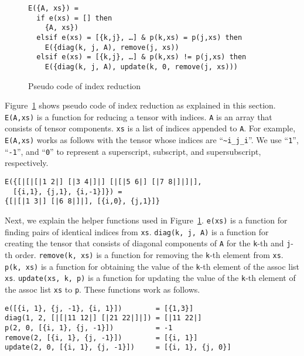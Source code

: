 \documentclass[acmlarge]{acmart}
\begin{document}
\begin{figure}
  \begin{center}
{\footnotesize
\begin{verbatim}
E({A, xs}) =
  if e(xs) = [] then
    {A, xs})
  elsif e(xs) = [{k,j}, …] & p(k,xs) = p(j,xs) then
    E({diag(k, j, A), remove(j, xs))
  elsif e(xs) = [{k,j}, …] & p(k,xs) != p(j,xs) then
    E({diag(k, j, A), update(k, 0, remove(j, xs)))
\end{verbatim}
}
  \end{center}
  \caption{Pseudo code of index reduction}
  \label{fig:semanticsRules}
\end{figure}

Figure~\ref{fig:semanticsRules} shows pseudo code of index reduction as explained in this section.
\texttt{E(A,xs)} is a function for reducing a tensor with indices.
\texttt{A} is an array that consists of tensor components.
\texttt{xs} is a list of indices appended to \texttt{A}.
For example, \texttt{E(A,xs)} works as follows with the tensor whose indices are ``\verb|~i_j_i|''.
We use ``\texttt{1}'', ``\texttt{-1}'', and ``\texttt{0}'' to represent a superscript, subscript, and supersubscript, respectively.

{\footnotesize
\begin{verbatim}
E({[|[|[|1 2|] [|3 4|]|] [|[|5 6|] [|7 8|]|]|],
  [{i,1}, {j,1}, {i,-1}]}) =
{[|[|1 3|] [|6 8|]|], [{i,0}, {j,1}]}
\end{verbatim}
}

Next, we explain the helper functions used in Figure~\ref{fig:semanticsRules}.
\texttt{e(xs)} is a function for finding pairs of identical indices from \texttt{xs}.
\texttt{diag(k, j, A)} is a function for creating the tensor that consists of diagonal components of \texttt{A} for the \texttt{k}-th and \texttt{j}-th order.
\texttt{remove(k, xs)} is a function for removing the \texttt{k}-th element from \texttt{xs}.
\texttt{p(k, xs)} is a function for obtaining the value of the \texttt{k}-th element of the assoc list \texttt{xs}.
\texttt{update(xs, k, p)} is a function for updating the value of the \texttt{k}-th element of the assoc list \texttt{xs} to \texttt{p}.
These functions work as follows.

{\footnotesize
\begin{verbatim}
e([{i, 1}, {j, -1}, {i, 1}])        = [{1,3}]
diag(1, 2, [|[|11 12|] [|21 22|]|]) = [|11 22|]
p(2, 0, [{i, 1}, {j, -1}])          = -1
remove(2, [{i, 1}, {j, -1}])        = [{i, 1}]
update(2, 0, [{i, 1}, {j, -1}])     = [{i, 1}, {j, 0}]
\end{verbatim}
}
\end{document}
